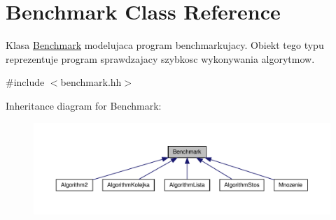 \hypertarget{class_benchmark}{\section{Benchmark Class Reference}
\label{class_benchmark}
}


Klasa \hyperlink{class_benchmark}{Benchmark} modelujaca program benchmarkujacy. Obiekt tego typu reprezentuje program sprawdzajacy szybkosc wykonywania algorytmow.  




{\ttfamily \#include $<$benchmark.\-hh$>$}



Inheritance diagram for Benchmark\-:\nopagebreak
\begin{figure}[H]
\begin{center}
\leavevmode
\includegraphics[width=350pt]{class_benchmark__inherit__graph}
\end{center}
\end{figure}
